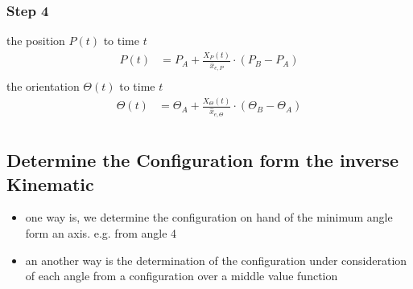 \documentclass[%
  professionalfonts,%
  xcolor={%
    usenames,%
    dvipsnames,%
    svgnames,%
    table,%
    hyperref%
  }%
]{beamer}
\begin{document}
\subsubsection{Step 4}
\begin{frame}
the position $P(t)$ to time $t$
\begin{align*}
P(t) & = P_{A} + \frac{X_{P}(t)}{\hat{x}_{e,P}} \cdot \left(P_{B} - P_{A} \right)\\
\end{align*}
the orientation $\Theta(t)$ to time $t$
\begin{align*}
\Theta(t) & = \Theta_{A} + \frac{X_{\Theta}(t)}{\hat{x}_{e,\Theta}} \cdot \left(\Theta_{B} - \Theta_{A} \right)\\
\end{align*}
\end{frame}


\subsection{Determine the Configuration form the inverse Kinematic}
\begin{frame}
\begin{itemize}
\item one way is, we determine the configuration on hand of the minimum angle form an axis. e.g. from angle 4 \\
\end{itemize}


\end{frame}

\begin{frame}
\begin{itemize}
  \item an another way is the determination of the configuration under consideration of each angle from a configuration over a middle value function \\
\end{itemize}


\end{frame}
\end{document}
